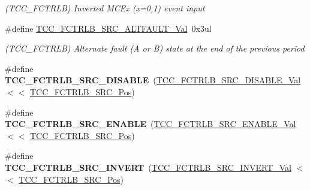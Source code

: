 \begin{DoxyCompactItemize}
\begin{DoxyCompactList}\small\item\em (T\+C\+C\+\_\+\+F\+C\+T\+R\+L\+B) Inverted M\+C\+Ex (x=0,1) event input \end{DoxyCompactList}\item 
\hypertarget{group___s_a_m_l21___t_c_c_gaa224cfde9f079084ef4567c7570f5b3d}{}\#define \hyperlink{group___s_a_m_l21___t_c_c_gaa224cfde9f079084ef4567c7570f5b3d}{T\+C\+C\+\_\+\+F\+C\+T\+R\+L\+B\+\_\+\+S\+R\+C\+\_\+\+A\+L\+T\+F\+A\+U\+L\+T\+\_\+\+Val}~0x3ul\label{group___s_a_m_l21___t_c_c_gaa224cfde9f079084ef4567c7570f5b3d}

\begin{DoxyCompactList}\small\item\em (T\+C\+C\+\_\+\+F\+C\+T\+R\+L\+B) Alternate fault (A or B) state at the end of the previous period \end{DoxyCompactList}\item 
\hypertarget{group___s_a_m_l21___t_c_c_ga1351028dfdbd79d70367a9ff2066b493}{}\#define {\bfseries T\+C\+C\+\_\+\+F\+C\+T\+R\+L\+B\+\_\+\+S\+R\+C\+\_\+\+D\+I\+S\+A\+B\+L\+E}~(\hyperlink{group___s_a_m_l21___t_c_c_gac3c686f822e3629ffcb2554af6eb2db4}{T\+C\+C\+\_\+\+F\+C\+T\+R\+L\+B\+\_\+\+S\+R\+C\+\_\+\+D\+I\+S\+A\+B\+L\+E\+\_\+\+Val}    $<$$<$ \hyperlink{group___s_a_m_l21___t_c_c_ga8cc27791b6546da73f032510287b61d5}{T\+C\+C\+\_\+\+F\+C\+T\+R\+L\+B\+\_\+\+S\+R\+C\+\_\+\+Pos})\label{group___s_a_m_l21___t_c_c_ga1351028dfdbd79d70367a9ff2066b493}

\item 
\hypertarget{group___s_a_m_l21___t_c_c_ga8a4fa7caee1814fd5fe96d1223f5298d}{}\#define {\bfseries T\+C\+C\+\_\+\+F\+C\+T\+R\+L\+B\+\_\+\+S\+R\+C\+\_\+\+E\+N\+A\+B\+L\+E}~(\hyperlink{group___s_a_m_l21___t_c_c_ga5e5e1f08fb8d7f78e5aa11c00637e495}{T\+C\+C\+\_\+\+F\+C\+T\+R\+L\+B\+\_\+\+S\+R\+C\+\_\+\+E\+N\+A\+B\+L\+E\+\_\+\+Val}     $<$$<$ \hyperlink{group___s_a_m_l21___t_c_c_ga8cc27791b6546da73f032510287b61d5}{T\+C\+C\+\_\+\+F\+C\+T\+R\+L\+B\+\_\+\+S\+R\+C\+\_\+\+Pos})\label{group___s_a_m_l21___t_c_c_ga8a4fa7caee1814fd5fe96d1223f5298d}

\item 
\hypertarget{group___s_a_m_l21___t_c_c_ga907c3363235ac6191b2d512705304eeb}{}\#define {\bfseries T\+C\+C\+\_\+\+F\+C\+T\+R\+L\+B\+\_\+\+S\+R\+C\+\_\+\+I\+N\+V\+E\+R\+T}~(\hyperlink{group___s_a_m_l21___t_c_c_ga72ead968f49bfe631ca868fbf4f096af}{T\+C\+C\+\_\+\+F\+C\+T\+R\+L\+B\+\_\+\+S\+R\+C\+\_\+\+I\+N\+V\+E\+R\+T\+\_\+\+Val}     $<$$<$ \hyperlink{group___s_a_m_l21___t_c_c_ga8cc27791b6546da73f032510287b61d5}{T\+C\+C\+\_\+\+F\+C\+T\+R\+L\+B\+\_\+\+S\+R\+C\+\_\+\+Pos})\label{group___s_a_m_l21___t_c_c_ga907c3363235ac6191b2d512705304eeb}


\end{DoxyCompactItemize}
